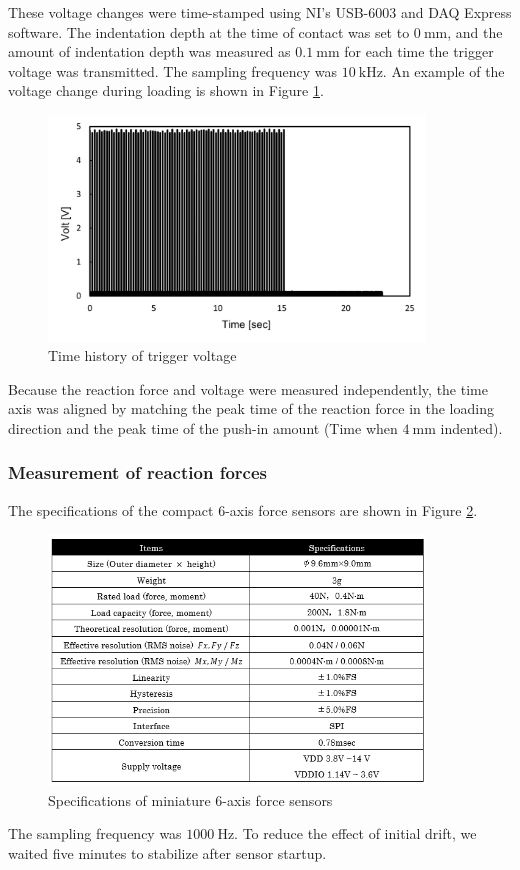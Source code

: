 These voltage changes were time-stamped using NI's USB-6003 and DAQ Express software. The indentation depth at the time of contact was set to
$\SI{0}{\milli \m}$, and the amount of indentation depth was measured as $\SI{0.1}{\milli \m}$ for each time the trigger voltage was transmitted. The sampling frequency was 
$\SI{10}{\kilo \hertz}$. An example of the voltage change during loading is shown in Figure \ref{fig:timevoltageynu}.\\
\begin{figure}%
	\centering
   \quad
   \includegraphics[width=10cm]{Images/appendix/ynu/fig4timehistoryoftriggervoltage.png}%
   \caption{Time history of trigger voltage}%
   \label{fig:timevoltageynu}%
\end{figure}
Because the reaction force and voltage were measured independently, the time axis was aligned by matching the peak time of the reaction force in the loading direction and the peak time of the push-in amount (Time when $\SI{4}{\milli \m}$ indented).

\subsubsection*{Measurement of reaction forces}
The specifications of the compact 6-axis force sensors are shown in Figure \ref{fig:specsensorynu}. 
\begin{figure}%
	\centering
   \quad
   \includegraphics[width=10cm]{Images/appendix/ynu/tab1specificationsofminiature6axisforcesensors.png}%
   \caption{Specifications of miniature 6-axis force sensors}%
   \label{fig:specsensorynu}%
\end{figure}
The sampling frequency was $\SI{1000}{\hertz}$. To reduce the effect of initial drift, we waited five minutes to stabilize after sensor startup.

